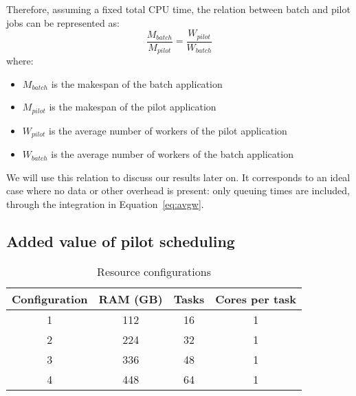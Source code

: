 \documentclass{IEEEtran}
\begin{document}
    Therefore, assuming a fixed total CPU time, the relation
    between batch and pilot jobs can be represented as:
    \begin{equation}
        \frac{M_{batch}}{M_{pilot}} = \frac{W_{pilot}}{W_{batch}}\label{eq:makespancomp}
    \end{equation}
    where:
    \begin{itemize}
        \item $M_{batch}$ is the makespan of the batch application
        \item $M_{pilot}$ is the makespan of the pilot application
        \item $W_{pilot}$ is the average number of workers of the pilot application
        \item $W_{batch}$ is the average number of workers of the batch application
    \end{itemize}
    We will use this relation to discuss our results later on. It
    corresponds to an ideal case where no data or other overhead is
    present: only queuing times are included, through the integration in
    Equation~\ref{eq:avgw}.

    \subsection{Added value of pilot scheduling}
        \begin{table}                                                                    
            \centering                                                                       
            \begin{tabular}{c|c|c|c}                                                             
            \rowcolor{headcolor}                                                             
            Configuration & RAM (GB) & Tasks & Cores per task\\                               
            \hline                                                                           
            1 & 112 & 16 & 1\\                                               
            2 & 224 & 32 & 1\\                                               
            3 & 336 & 48 & 1\\
            4 & 448 & 64 & 1\\
            \end{tabular}                                                                    
            \setlength{\belowcaptionskip}{-10pt}                                             
            \caption{Resource configurations}                                                    
            \label{table:dedicatednodes}                                                            
        \end{table} 
           
\end{document}
